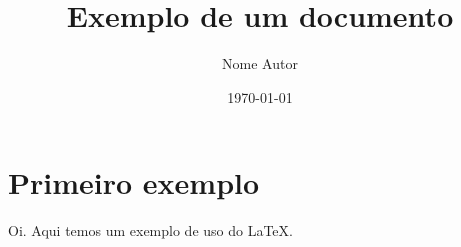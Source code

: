 \documentclass{article}
\title{Exemplo de um documento}
\author{Nome Autor}
\date{\today}
\begin{document}
   \maketitle
   \section{Primeiro exemplo}
   Oi. Aqui temos um exemplo de uso do \LaTeX.
 
\end{document}

